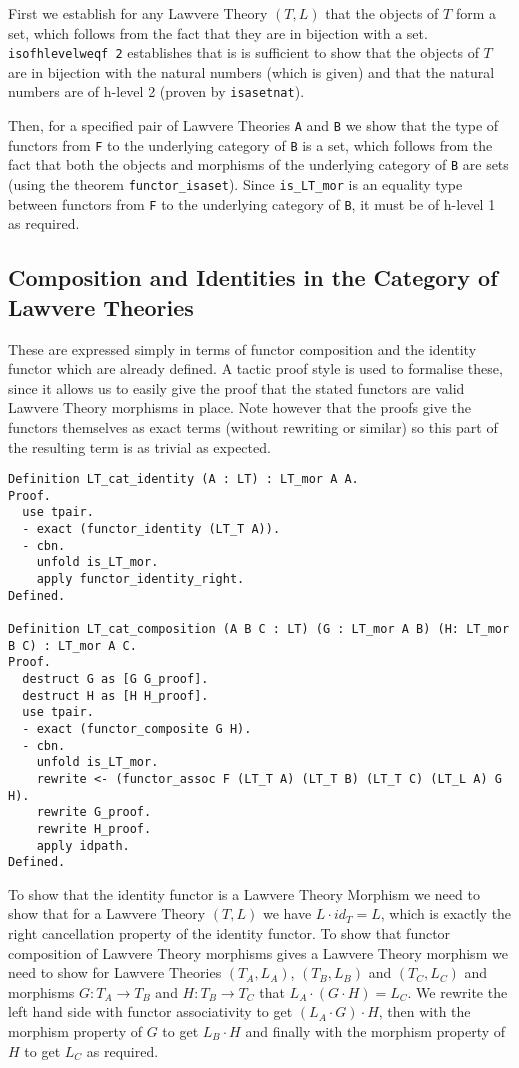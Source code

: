 First we establish for any Lawvere Theory $(T, L)$ that the objects of $T$ form
a set, which follows from the fact that they are in bijection with a set.
\lstinline|isofhlevelweqf 2| establishes that is is sufficient to show that the
objects of $T$ are in bijection with the natural numbers (which is given) and
that the natural numbers are of h-level 2 (proven by \lstinline|isasetnat|).

Then, for a specified pair of Lawvere Theories \lstinline|A| and \lstinline|B| we show
that the type of functors from \lstinline|F| to the underlying category of \lstinline|B|
is a set, which follows from the fact that both the objects and morphisms of the
underlying category of \lstinline|B| are sets (using the theorem
\lstinline|functor_isaset|). Since \lstinline|is_LT_mor| is an equality type between
functors from \lstinline|F| to the underlying category of \lstinline|B|, it must be of
h-level 1 as required.

\subsection{Composition and Identities in the Category of Lawvere Theories}
These are expressed simply in terms of functor composition and the identity
functor which are already defined. A tactic proof style is used to formalise
these, since it allows us to easily give the proof that the stated functors are
valid Lawvere Theory morphisms in place. Note however that the proofs give the
functors themselves as exact terms (without rewriting or similar) so this part
of the resulting term is as trivial as expected.
\begin{lstlisting}
Definition LT_cat_identity (A : LT) : LT_mor A A.
Proof.
  use tpair.
  - exact (functor_identity (LT_T A)).
  - cbn.
    unfold is_LT_mor.
    apply functor_identity_right.
Defined.

Definition LT_cat_composition (A B C : LT) (G : LT_mor A B) (H: LT_mor B C) : LT_mor A C.
Proof.
  destruct G as [G G_proof].
  destruct H as [H H_proof].
  use tpair.
  - exact (functor_composite G H).
  - cbn.
    unfold is_LT_mor.
    rewrite <- (functor_assoc F (LT_T A) (LT_T B) (LT_T C) (LT_L A) G H).
    rewrite G_proof.
    rewrite H_proof.
    apply idpath.
Defined.
\end{lstlisting}

To show that the identity functor is a Lawvere Theory Morphism we need to show
that for a Lawvere Theory $(T, L)$ we have $L\cdot id_T = L$, which is exactly
the right cancellation property of the identity functor. To show that functor
composition of Lawvere Theory morphisms gives a Lawvere Theory morphism we need
to show for Lawvere Theories $(T_A, L_A)$, $(T_B, L_B)$ and $(T_C, L_C)$
and morphisms $G: T_A\to T_B$ and $H: T_B\to T_C$ that $L_A\cdot (G\cdot H) =
L_C$. We rewrite the left hand side with functor associativity to get $(L_A\cdot
G)\cdot H$, then with the morphism property of $G$ to get $L_B\cdot H$ and
finally with the morphism property of $H$ to get $L_C$ as required.

